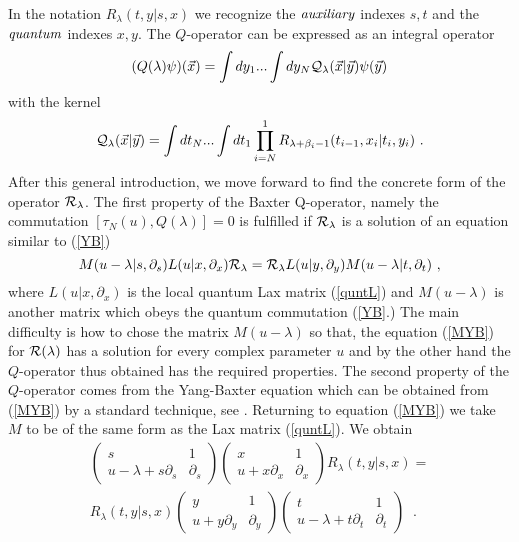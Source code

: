 \documentclass[a4paper,11pt]{article}
\begin{document}
In the notation $R_{\lambda}(t,y|s,x)$ we recognize the ${\it auxiliary }$
indexes $s,t$ and the ${\it quantum}$ indexes $x,y$. The $Q$-operator can be
expressed as an integral operator
\begin{equation}
\label{intQ}
(Q(\lambda ) \psi)({\vec x})
     =\int dy_1...\int dy_N {\cal Q}_\lambda ({\vec x}|{\vec y})\psi ({\vec y})
\end{equation}
with the kernel
\begin{equation}
\label{K}
{\cal Q}_\lambda ({\vec x}|{\vec y})=\int dt_N...\int dt_1 \prod_{i=N}^1
    R_{\lambda +\beta_i-1}(t_{i-1},x_i|t_i,y_i) ~.
\end{equation}
After this general introduction, we move forward to find the concrete form
of the operator ${\cal R}_\lambda$. The first property of the Baxter
Q-operator, namely the commutation $[\tau_N(u),Q(\lambda )]=0$ is fulfilled
if ${\cal R}_\lambda $ is a solution of an equation similar to (\ref{YB})
\begin{equation}
\label{MYB}
M(u-\lambda |s,\partial_s) L(u|x,\partial_x){\cal R}_\lambda={\cal R}_\lambda
L(u|y,\partial_y)M(u-\lambda |t,\partial_t) ~,
\end{equation}
where $L(u|x,\partial_x)$ is the local quantum Lax matrix (\ref{quntL}) and
$M(u-\lambda)$ is another matrix which obeys the quantum commutation
(\ref{YB}.) The main difficulty is how to chose the matrix $M(u-\lambda)$ so
that, the equation (\ref{MYB}) for ${\cal R}(\lambda)$ has a solution for
every complex parameter $u$ and by the other hand the $Q$-operator thus
obtained has the required properties. The second property of the
$Q$-operator comes from the Yang-Baxter equation which can be obtained from
(\ref{MYB}) by a standard technique, see \cite{Faddeev}. Returning to
equation (\ref{MYB}) we take $M$ to be of the same form as the Lax matrix
(\ref{quntL}). We obtain
\begin{eqnarray}
\label{mlquatum1}
\left(\begin{array}{cc}
           s      & 1  \\
           u-\lambda +s\partial_s    &  \partial_s
         \end{array}\right )\left(\begin{array}{cc}
          x      & 1  \\
           u+x\partial_x     &  \partial_x
         \end{array}\right )R_{\lambda}(t,y|s,x)=\\ \nonumber
         R_{\lambda}(t,y|s,x)\left(\begin{array}{cc}
          y     & 1  \\
           u+y\partial_y    &  \partial_y
         \end{array}\right )\left(\begin{array}{cc}
          t      & 1  \\
           u-\lambda+t\partial_t    &  \partial_t
         \end{array}\right )\;\;.
\end{eqnarray}
\end{document}
